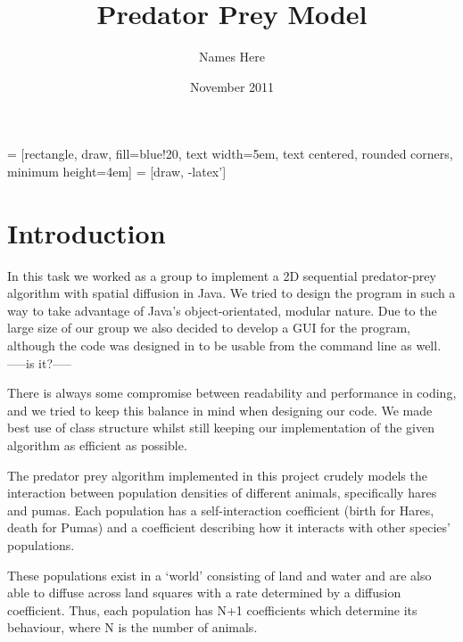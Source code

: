 \documentclass[11pt]{report}
\title{Predator Prey Model}
\author{Names Here}
\date{November 2011}
\begin{document}
\usetikzlibrary{shapes,arrows}


 = [rectangle, draw, fill=blue!20, 
    text width=5em, text centered, rounded corners, minimum height=4em]
 = [draw, -latex']

\maketitle

\begin{abstract}
\end{abstract}

\tableofcontents

\chapter{Introduction}


In this task we worked as a group to implement a 2D sequential predator-prey algorithm with spatial diffusion
in Java. We tried to design the program in such a way to take advantage of Java's object-orientated, modular nature. 
Due to the large size of our group we also decided to develop a GUI for the program, although the code was designed 
in to be usable from the command line as well. -----is it?-----\newline{}

There is always some compromise between readability and performance in coding, and we tried to keep this balance in mind
when designing our code. We made best use of class structure whilst still keeping our implementation of the given 
algorithm as efficient as possible.\newline{}

The predator prey algorithm implemented in this project crudely models the interaction between population densities of different animals, specifically hares and pumas. Each population has a self-interaction coefficient (birth for Hares, death for Pumas) and a coefficient describing how it interacts with other species' populations. \newline{}

These populations exist in a `world' consisting of land and water and are also able to diffuse across land squares with a rate determined by a diffusion coefficient. Thus, each population has N+1 coefficients which determine its behaviour, where N is the number of animals.
\end{document}
